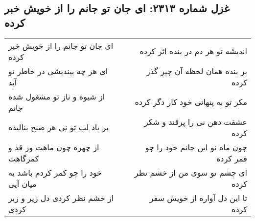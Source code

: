 \begin{center}
\section*{غزل شماره ۲۳۱۳: ای جان تو جانم را از خویش خبر کرده}
\label{sec:2313}
\begin{longtable}{l p{0.5cm} r}
ای جان تو جانم را از خویش خبر کرده
&&
اندیشه تو هر دم در بنده اثر کرده
\\
ای هر چه بیندیشی در خاطر تو آید
&&
بر بنده همان لحظه آن چیز گذر کرده
\\
از شیوه و ناز تو مشغول شده جانم
&&
مکر تو به پنهانی خود کار دگر کرده
\\
بر یاد لب تو نی هر صبح بنالیده
&&
عشقت دهن نی را پرقند و شکر کرده
\\
از چهره چون ماهت وز قد و کمرگاهت
&&
چون ماه نو این جانم خود را چو قمر کرده
\\
خود را چو کمر کردم باشد به میان آیی
&&
ای چشم تو سوی من از خشم نظر کرده
\\
از خشم نظر کردی دل زیر و زبر کردی
&&
تا این دل آواره از خویش سفر کرده
\\
\end{longtable}
\end{center}
